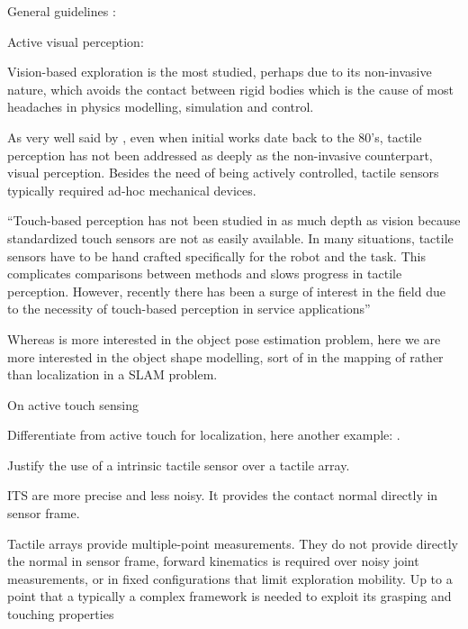 
 

General guidelines : \citet{Bajcsy1989Machine}

Active visual perception: \citet{Bajcsy1988Active}

Vision-based exploration is the most studied, perhaps due to its non-invasive nature, which avoids the contact between rigid bodies which is the cause of most headaches in physics modelling, simulation and control.

As very well said by \citet{Petrovskaya2011Global}, even when initial works date back to the 80's, tactile perception has not been addressed as deeply as the non-invasive counterpart, visual perception. Besides the need of being actively controlled, tactile sensors typically required ad-hoc mechanical devices.

``Touch-based perception has not been studied in as much depth
as vision because standardized touch sensors are not as easily
available. In many situations, tactile sensors have to be hand
crafted specifically for the robot and the task. This complicates
comparisons between methods and slows progress in tactile
perception. However, recently there has been a surge of interest
in the field due to the necessity of touch-based perception in
service applications''

Whereas \citet{Petrovskaya2011Global} is more interested in the object pose estimation problem, here we are more interested in the object shape modelling, sort of in the mapping of rather than localization in a SLAM problem.

On active touch sensing \citet{Prescott2011Active}

Differentiate from active touch for localization, here another example: \citet{Hebert2013Next}.

Justify the use of a intrinsic tactile sensor over a tactile array.

ITS are more precise and less noisy. It provides the contact normal directly in sensor frame.

Tactile arrays provide multiple-point measurements. They do not provide directly the normal in sensor frame, forward kinematics is required over noisy joint measurements, or in fixed configurations that limit exploration mobility. Up to a point that a typically a complex framework is needed to exploit its grasping and touching properties %

